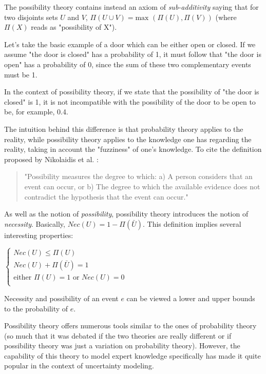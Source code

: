 The possibility theory contains instead an axiom of \emph{sub-additivity} saying that for two disjoints sets $U$ and $V$, $\Pi(U \cup V) = \text{max }(\Pi(U), \Pi(V))$ (where $\Pi(X)$ reads as "possibility of X").

Let's take the basic example of a door which can be either open or closed. If we assume "the door is closed" has a probability of 1, it must follow that "the door is open" has a probability of 0, since the sum of these two complementary events must be 1.

In the context of possibility theory, if we state that the possibility of "the door is closed" is 1, it is not incompatible with the possibility of the door to be open to be, for example, 0.4.

The intuition behind this difference is that probability theory applies to the reality, while possibility theory applies to the knowledge one has regarding the reality, taking in account the "fuzziness" of one's knowledge. To cite the definition proposed by Nikolaidis et al. \cite{nikolaidis:386}:
\begin{quote}
"Possibility measures the degree to which: a) A person considers that an event can
occur, or b) The degree to which the available evidence does not contradict the
hypothesis that the event can occur."
\end{quote}

As well as the notion of \emph{possibility}, possibility theory introduces the notion of \emph{necessity}. Basically, $Nec(U) = 1 - \Pi(\bar{U})$.
This definition implies several interesting properties:

$\left\{
\begin{array}{l}
Nec(U) \leq \Pi(U)\\
Nec(U) + \Pi(\bar{U}) = 1\\
\text{either } \Pi(U) = 1 \text{ or } Nec(U) = 0\\
\end{array}
\right.$

Necessity and possibility of an event $e$ can be viewed a lower and upper bounds to the probability of $e$.

Possibility theory offers numerous tools similar to the ones of probability theory (so much that it was debated if the two theories are really different or if possibility theory was just a variation on probability theory). However, the capability of this theory to model expert knowledge specifically has made it quite popular in the context of uncertainty modeling.

